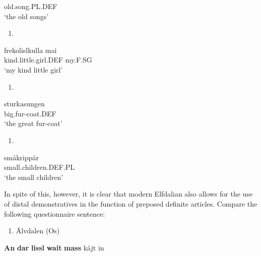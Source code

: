 old.song.PL.DEF\\ %


‘the old songs’
\z


\begin{enumerate} %
\item 
\end{enumerate} %
\ea\label{}
\gll frekolislkulla  mai\\


kind.little.girl.DEF  my.F.SG\\ %


‘my kind little girl’
\z


\begin{enumerate} %
\item 
\end{enumerate} %
\ea\label{}
\gll sturkasungen  \\


big.fur-coat.DEF  \\ %


‘the great fur-coat’
\z


\begin{enumerate} %
\item 
\end{enumerate} %
\ea\label{}
\gll småkrippär\\


small.children.DEF.PL\\ %


‘the small children’
\z


In spite of this, however, it is clear that modern Elfdalian also allows for the use of distal demonstratives in the function of preposed definite articles. Compare the following questionnaire sentence:

\begin{enumerate} %
\item 
Älvdalen (Os)

\end{enumerate} %
\ea\label{}
\gll \textbf{An} \textbf{dar} \textbf{lissl} \textbf{wait} \textbf{mass} kåjt  in\\



